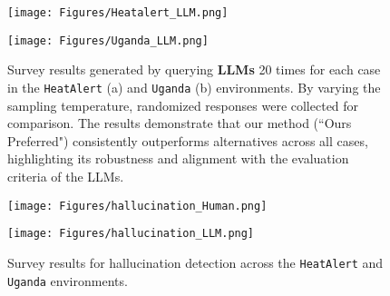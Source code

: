 \begin{figure}[H]
\centering
\begin{minipage}{.4\textwidth}
\centering
\texttt{[image: Figures/Heatalert\_LLM.png]}
 \label{fig:heatalert_LLM}
\end{minipage}\hfill
\begin{minipage}{.4\textwidth}
\centering
\texttt{[image: Figures/Uganda\_LLM.png]}
 \label{fig:Uganda_LLM}
\end{minipage}
\caption{Survey results generated by querying \textbf{LLMs} 20 times for each case in the \texttt{HeatAlert} (a) and \texttt{Uganda} (b) environments. By varying the sampling temperature, randomized responses were collected for comparison. The results demonstrate that our method (``Ours Preferred") consistently outperforms alternatives across all cases, highlighting its robustness and alignment with the evaluation criteria of the LLMs.}
        \label{fig:survey_LLMs}
\end{figure}



\begin{figure}[H]
\centering
\begin{minipage}{.6\textwidth}
\centering
\texttt{[image: Figures/hallucination\_Human.png]}
 \label{fig:Hallucination_human}
\end{minipage}\hfill
\begin{minipage}{.6\textwidth}
\centering
\texttt{[image: Figures/hallucination\_LLM.png]}
 \label{fig:Hallucination_LLM}
\end{minipage}
\caption{Survey results for hallucination detection across the \texttt{HeatAlert} and \texttt{Uganda} environments.}
        \label{fig:Hallucination_survey}
\end{figure}

